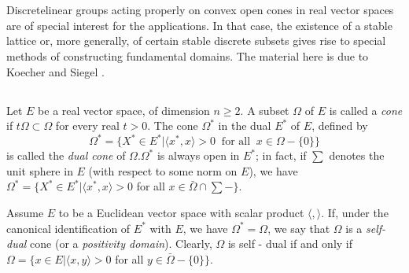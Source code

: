 \chapter{}\label{chap6}%

Discrete\pageoriginale linear groups acting properly on convex open cones in real
vector spaces are of special interest for the applications. In that
case, the existence of a stable lattice or, more generally, of
certain stable discrete subsets gives rise to special methods of
constructing fundamental domains. The material here is due to Koecher
\cite{key1} and Siegel \cite{key1}. 

\section{}%

Let $E$ be a real vector space, of dimension $n \geq 2$. A subset
$\Omega $ of $E$ is called a \textit{ cone } if $t \Omega \subset
\Omega $ for every real $t > 0$. The cone $\Omega^*$ in the dual $E^*$
of $E$, defined by  
$$
\Omega^* = \bigg \{ X^* \in E^* \big | \langle x^*, x \rangle > 0 ~\text { for all }~
x \in \Omega - \{ 0 \}\bigg \} 
$$
is called the \textit{ dual cone} of $\Omega . \Omega^*$ is always
open in $E^*$; in fact, if $\sum$ denotes the unit sphere in $E$ (with
respect to some norm on $E$), we have  
$ \Omega^* = \bigg \{ X^* \in E^* \bigg | \langle x^*, x \rangle > 0$ for all 
$x \in \bar{\Omega}\cap \sum - \bigg \} $. 

Assume $E$ to be a Euclidean vector space with scalar product $\langle
, \rangle $. If, under the canonical identification of $E^*$ with $E$,
we have $\Omega^* =  \Omega$, we say that $\Omega$ is a \textit{self-
  dual} cone (or a \textit{positivity domain}). Clearly, $\Omega$ is
self - dual if and only if $\Omega  = \bigg\{ x \in E \bigg | \langle
x, y \rangle > 0$ for all $y \in \bar{\Omega} - \{ 0\}\bigg\}$. 

